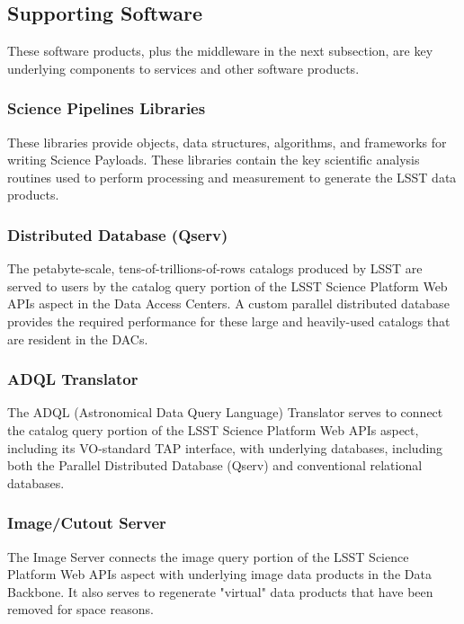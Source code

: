 \documentclass[DM,toc,lsstdraft]{lsstdoc}
\begin{document}
\subsection{Supporting Software}\label{supporting-software}

These software products, plus the middleware in the next subsection, are key underlying components to services and other software products.

\subsubsection{Science Pipelines Libraries}\label{science-pipelines-libraries}

These libraries provide objects, data structures, algorithms, and frameworks for writing Science Payloads.
These libraries contain the key scientific analysis routines used to perform processing and measurement to generate the LSST data products.

\subsubsection{Distributed Database
(Qserv)}\label{distributed-database-qserv}

The petabyte-scale, tens-of-trillions-of-rows catalogs produced by LSST are served to users by the catalog query portion of the LSST Science Platform Web APIs aspect in the Data Access Centers.
A custom parallel distributed database provides the required performance for these large and heavily-used catalogs that are resident in the DACs.

\subsubsection{ADQL Translator}\label{adql-translator}

The ADQL (Astronomical Data Query Language) Translator serves to connect the catalog query portion of the LSST Science Platform Web APIs aspect, including its VO-standard TAP interface, with underlying databases, including both the Parallel Distributed Database (Qserv) and conventional relational databases.

\subsubsection{Image/Cutout Server}\label{image-server}

The Image Server connects the image query portion of the LSST Science Platform Web APIs aspect with underlying image data products in the Data Backbone.
It also serves to regenerate "virtual" data products that have been removed for space reasons.
\end{document}
